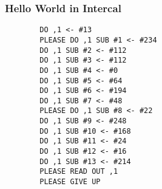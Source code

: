 %
\begin{frame}[fragile]
    \frametitle{Hello World in Intercal}
    \begin{verbatim}
        DO ,1 <- #13
        PLEASE DO ,1 SUB #1 <- #234
        DO ,1 SUB #2 <- #112
        DO ,1 SUB #3 <- #112
        DO ,1 SUB #4 <- #0
        DO ,1 SUB #5 <- #64
        DO ,1 SUB #6 <- #194
        DO ,1 SUB #7 <- #48
        PLEASE DO ,1 SUB #8 <- #22
        DO ,1 SUB #9 <- #248
        DO ,1 SUB #10 <- #168
        DO ,1 SUB #11 <- #24
        DO ,1 SUB #12 <- #16
        DO ,1 SUB #13 <- #214
        PLEASE READ OUT ,1
        PLEASE GIVE UP
    \end{verbatim}
\end{frame}

